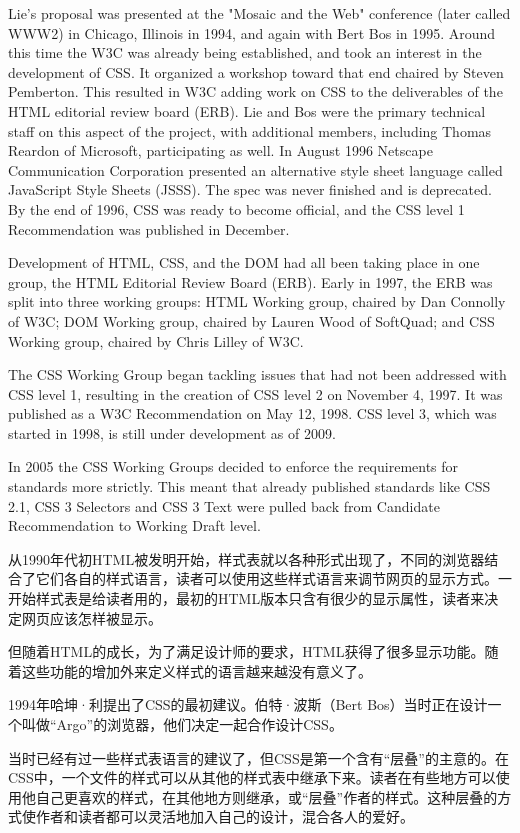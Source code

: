 Lie's proposal was presented at the "Mosaic and the Web" conference (later called WWW2) in Chicago, Illinois in 1994, and again with Bert Bos in 1995. Around this time the W3C was already being established, and took an interest in the development of CSS. It organized a workshop toward that end chaired by Steven Pemberton. This resulted in W3C adding work on CSS to the deliverables of the HTML editorial review board (ERB). Lie and Bos were the primary technical staff on this aspect of the project, with additional members, including Thomas Reardon of Microsoft, participating as well. In August 1996 Netscape Communication Corporation presented an alternative style sheet language called JavaScript Style Sheets (JSSS). The spec was never finished and is deprecated. By the end of 1996, CSS was ready to become official, and the CSS level 1 Recommendation was published in December.

Development of HTML, CSS, and the DOM had all been taking place in one group, the HTML Editorial Review Board (ERB). Early in 1997, the ERB was split into three working groups: HTML Working group, chaired by Dan Connolly of W3C; DOM Working group, chaired by Lauren Wood of SoftQuad; and CSS Working group, chaired by Chris Lilley of W3C.

The CSS Working Group began tackling issues that had not been addressed with CSS level 1, resulting in the creation of CSS level 2 on November 4, 1997. It was published as a W3C Recommendation on May 12, 1998. CSS level 3, which was started in 1998, is still under development as of 2009.

In 2005 the CSS Working Groups decided to enforce the requirements for standards more strictly. This meant that already published standards like CSS 2.1, CSS 3 Selectors and CSS 3 Text were pulled back from Candidate Recommendation to Working Draft level.

从1990年代初HTML被发明开始，样式表就以各种形式出现了，不同的浏览器结合了它们各自的样式语言，读者可以使用这些样式语言来调节网页的显示方式。一开始样式表是给读者用的，最初的HTML版本只含有很少的显示属性，读者来决定网页应该怎样被显示。

但随着HTML的成长，为了满足设计师的要求，HTML获得了很多显示功能。随着这些功能的增加外来定义样式的语言越来越没有意义了。

1994年哈坤·利提出了CSS的最初建议。伯特·波斯（Bert Bos）当时正在设计一个叫做“Argo”的浏览器，他们决定一起合作设计CSS。

当时已经有过一些样式表语言的建议了，但CSS是第一个含有“层叠”的主意的。在CSS中，一个文件的样式可以从其他的样式表中继承下来。读者在有些地方可以使用他自己更喜欢的样式，在其他地方则继承，或“层叠”作者的样式。这种层叠的方式使作者和读者都可以灵活地加入自己的设计，混合各人的爱好。

